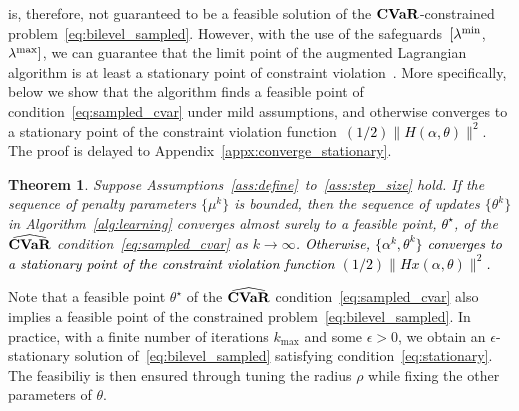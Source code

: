 \documentclass[11pt]{article}
\newtheorem{theorem}{Theorem}[section]
\newcommand{\bsnote}[1]{\noindent\textcolor{red}{\texttt{Bartolomeo: #1}}}
\newcommand{\RC}[1]{\textcolor{black}{#1}}
\begin{document}
is, therefore, not guaranteed to be a feasible solution of the $\mathop{\bf CVaR}$-constrained problem~\eqref{eq:bilevel_sampled}. 
However, with the use of the safeguards~$[\lambda^{\rm{min}}$, $\lambda^{\rm{max}}]$, we can guarantee that the limit point of the augmented Lagrangian algorithm is at least a stationary point of constraint violation~\cite[Theorem 6.3]{auglag_safe}.  
More specifically, below we show that the algorithm finds a feasible point of condition~\eqref{eq:sampled_cvar} under mild assumptions, and otherwise converges to a stationary point of the constraint violation function~\RC{$(1/2)\|H(\alpha,\theta)\|^2$}. 
The proof is delayed to Appendix~\ref{appx:converge_stationary}. 
\begin{theorem}
\label{thm:convergence}
Suppose Assumptions~\ref{ass:define}~to~\ref{ass:step_size} hold.
If the sequence of penalty parameters $\{\mu^k\}$ is bounded, then the sequence of updates $\{\theta^k\}$ in Algorithm~\ref{alg:learning} converges almost surely to a feasible point, \RC{$\theta^\star$}, of the $\widehat{\mathop{\bf CVaR}}$ condition~\eqref{eq:sampled_cvar} as $k\to\infty$.  %
\RC{Otherwise, $\{\alpha^k,\theta^k\}$ converges to a stationary point of the constraint violation function  $(1/2)\|Hx(\alpha,\theta)\|^2$.}
\end{theorem}
Note that a feasible point $\theta^\star$ of the $\widehat{\mathop{\bf CVaR}}$ condition~\eqref{eq:sampled_cvar} also implies a feasible point of the constrained problem~\eqref{eq:bilevel_sampled}. 
In practice, with a finite number of iterations $k_{\text{max}}$ and some $\epsilon > 0$, we obtain an $\epsilon$-stationary solution of~\eqref{eq:bilevel_sampled} satisfying condition~\eqref{eq:stationary}. The feasibiliy is then ensured through tuning the radius $\rho$ while fixing the other parameters of $\theta$.
\end{document}
